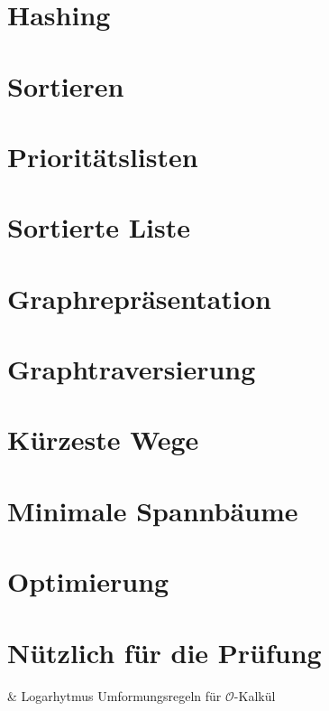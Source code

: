 \documentclass[a4paper]{scrartcl}
\begin{document}
		\subsection{}
		\subsection{}
	
		
\section[Chaos als Ordnungsprinzip]{Hashing}
\section[Effizienz durch Ordnung]{Sortieren}
\section[Immer die Übersicht behalten]{Prioritätslisten}
\section[Die eierlegende Wollmilchsau]{Sortierte Liste}
\section[Beziehungen im Griff haben]{Graphrepräsentation}
\section[Globalen Dingen auf der Spur]{Graphtraversierung}
\section[Schnellstens zum Ziel]{Kürzeste Wege}
\section[Immer gut verbunden]{Minimale Spannbäume}
\section[Noch mehr Entwurfsmethoden]{Optimierung}
\section{Nützlich für die Prüfung}
	\begin{easylist}
		& Logarhytmus Umformungsregeln für \(\mathcal{O}\)-Kalkül
	\end{easylist}
\end{document}
